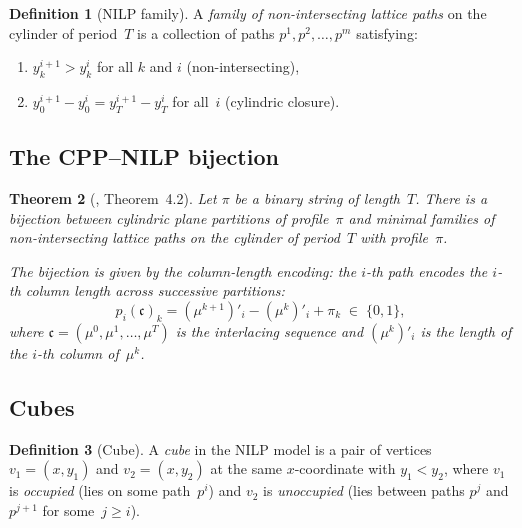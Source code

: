 \documentclass[11pt]{article}
\theoremstyle{plain}
\newtheorem{theorem}{Theorem}
\theoremstyle{definition}
\newtheorem{definition}[theorem]{Definition}
\begin{document}
\begin{definition}[NILP family]
\label{def:NILP}
A \emph{family of non-intersecting lattice paths} on the
cylinder of period~$T$ is a collection of paths
$p^1, p^2, \ldots, p^m$ satisfying:
\begin{enumerate}
  \item $y_k^{i+1} > y_k^i$ for all $k$ and $i$
    \textup{(non-intersecting)},
  \item $y_0^{i+1} - y_0^i = y_T^{i+1} - y_T^i$ for all~$i$
    \textup{(cylindric closure)}.
\end{enumerate}
\end{definition}


\subsection{The CPP--NILP bijection}

\begin{theorem}[{\cite{langer-thesis}, Theorem~4.2}]
\label{thm:NILP-bijection}
Let $\pi$ be a binary string of length~$T$.  There is a
bijection between cylindric plane partitions of profile~$\pi$
and minimal families of non-intersecting lattice paths on
the cylinder of period~$T$ with profile~$\pi$.

The bijection is given by the \emph{column-length encoding}:
the $i$-th path encodes the $i$-th column length across
successive partitions:
\begin{equation}\label{eq:column-path}
  \boxed{\;
  p_i(\mathfrak{c})_k
  = (\mu^{k+1})'_i - (\mu^k)'_i + \pi_k
  \;\in\; \{0, 1\},
  \;}
\end{equation}
where $\mathfrak{c} = (\mu^0, \mu^1, \ldots, \mu^T)$ is the
interlacing sequence and $(\mu^k)'_i$ is the length of the
$i$-th column of~$\mu^k$.
\end{theorem}


\subsection{Cubes}

\begin{definition}[Cube]
\label{def:cube}
A \emph{cube} in the NILP model is a pair of vertices
$v_1 = (x, y_1)$ and $v_2 = (x, y_2)$ at the same
$x$-coordinate with $y_1 < y_2$, where $v_1$ is
\emph{occupied} (lies on some path~$p^i$) and $v_2$ is
\emph{unoccupied} (lies between paths $p^j$ and $p^{j+1}$
for some~$j \geq i$).
\end{definition}
\end{document}
